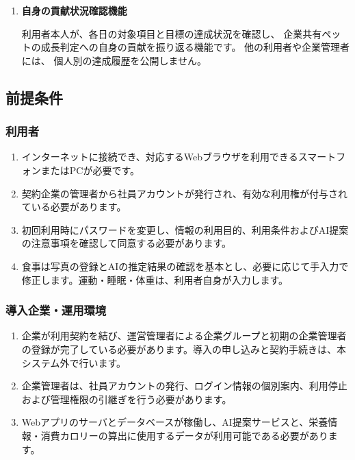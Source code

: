 \documentclass[uplatex,dvipdfmx]{jlreq}
\begin{document}
\begin{enumerate}
初期レベルと最低レベルは1とし、レベルの増減は一日一回までとします。
成長段階の区分 は、個人用ペットと同じとします。

\item \textbf{自身の貢献状況確認機能}

利用者本人が、各日の対象項目と目標の達成状況を確認し、
企業共有ペットの成長判定への自身の貢献を振り返る機能です。
他の利用者や企業管理者には、
個人別の達成履歴を公開しません。
\end{enumerate}


\subsection{前提条件}
\subsubsection{利用者}
\begin{enumerate}
\item インターネットに接続でき、対応するWebブラウザを利用できるスマートフォンまたはPCが必要です。
\item 契約企業の管理者から社員アカウントが発行され、有効な利用権が付与されている必要があります。
\item 初回利用時にパスワードを変更し、情報の利用目的、利用条件およびAI提案の注意事項を確認して同意する必要があります。
\item 食事は写真の登録とAIの推定結果の確認を基本とし、必要に応じて手入力で修正します。運動・睡眠・体重は、利用者自身が入力します。
\end{enumerate}

\subsubsection{導入企業・運用環境}
\begin{enumerate}
\item 企業が利用契約を結び、運営管理者による企業グループと初期の企業管理者の登録が完了している必要があります。導入の申し込みと契約手続きは、本システム外で行います。

\item 企業管理者は、社員アカウントの発行、ログイン情報の個別案内、利用停止および管理権限の引継ぎを行う必要があります。

\item Webアプリのサーバとデータベースが稼働し、AI提案サービスと、栄養情報・消費カロリーの算出に使用するデータが利用可能である必要があります。
\end{enumerate}
\end{document}
